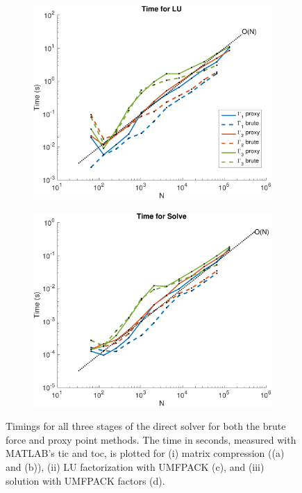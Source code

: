 \documentclass{sfuthesis}
\begin{document}
\begin{figure}[h!]
\begin{subfigure}{0.5\textwidth}
		 \caption{}
 		\label{fig: Ex4-1TimeProxyComp}
	 \end{subfigure}
 	\begin{subfigure}{0.5\textwidth}
 		\includegraphics[width=\textwidth]{Ex4-1TimeBruteProxyLU}
		 \caption{}
		 \label{fig: Ex4-1TimeBruteProxyLU}
 	\end{subfigure}
 	\begin{subfigure}{0.5\textwidth}
 		\includegraphics[width=\textwidth]{Ex4-1TimeBruteProxySolve}
 		\caption{}
		\label{fig: Ex4-1TimeBruteProxySolve}
 	\end{subfigure}
 	\caption{Timings for all three stages of the direct solver for both the brute force and proxy point methods. The time in seconds, measured with MATLAB's tic and toc, is plotted for (i) matrix compression ((a) and (b)), (ii) LU factorization with UMFPACK (c), and (iii) solution with UMFPACK factors (d).}
 	\label{fig: Ex4-1TimeResults}
 \end{figure}
\end{document}
